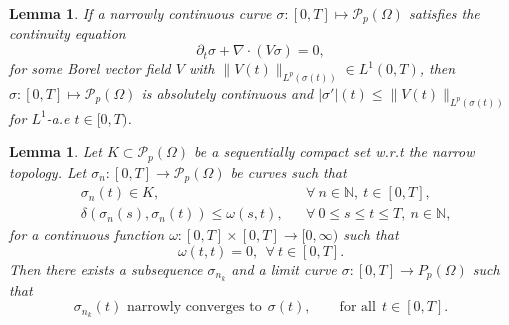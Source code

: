 \documentclass{amsart}
\newtheorem{lemma}[defn]{Lemma}
\numberwithin{equation}{section}
\begin{document}
\begin{lemma}\label{representation of AC curves} \cite[Theorem 5.14]{Santambrosio15}
If a narrowly continuous curve $\sigma : [0,T] \mapsto \mathcal{P}_p (\Omega)$ satisfies the continuity equation
$$\partial_t\sigma +\nabla\cdot(V\sigma)=0,  $$
for some Borel vector field $V$ with $\|V(t)\|_{L^p(\sigma(t))}\in L^1(0,T)$, then $\sigma: [0,T]\mapsto \mathcal{P}_p (\Omega)$
is absolutely continuous and
$|\sigma'|(t)\leq \|V(t)\|_{L^p(\sigma(t))}$ for $L^1$-a.e $t\in [0,T)$.
\end{lemma}


\begin{lemma}\label{Lemma : Arzela-Ascoli} \cite[Proposition 3.3.1]{ags:book}
Let $K  \subset \mathcal{P}_p(\Omega)$ be a sequentially compact set w.r.t the narrow topology.
Let $\sigma_n : [0, T] \rightarrow \mathcal{P}_p (\Omega)$ be curves such that 
\begin{equation*}\label{equi-continuity}
\begin{aligned}
&\sigma_n(t) \in K,  &&\forall ~ n \in \mathbb{N}, ~ t \in [0,T],\\
&\delta (\sigma_n(s),\sigma_n(t))\leq \omega(s,t), &&\forall ~
0\leq s\leq t\leq T, ~ n \in \mathbb{N},
\end{aligned}
\end{equation*}
for a continuous function $\omega : [0, T] \times [0, T] \rightarrow [0, \infty)$ such that
$$\omega(t,t)=0, ~~ \forall ~ t \in [0,T].$$
Then there exists a subsequence $\sigma_{n_k}$ and a limit curve $\sigma : [0,T] \rightarrow {P}_p(\Omega)$ such that
\begin{equation*}\label{eq1 : Lemma : Arzela-Ascoli}
\sigma_{n_k}(t) \mbox{ narrowly converges to} ~~\sigma(t), \qquad
\text{for all} ~~t\in[0, T].
\end{equation*}
\end{lemma}
\end{document}
